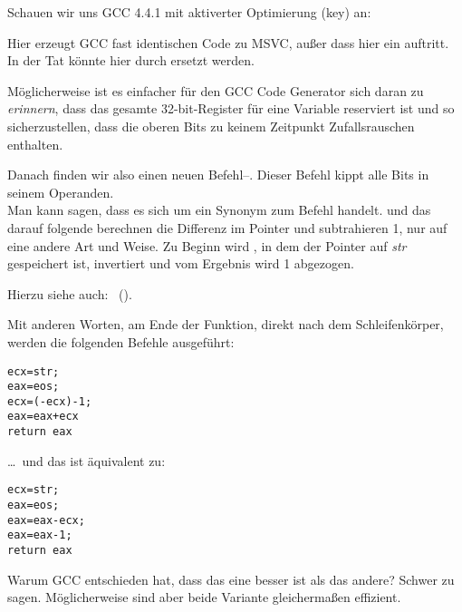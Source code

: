 


Schauen wir uns GCC 4.4.1 mit aktiverter Optimierung (\Othree key) an:


 
Hier erzeugt GCC fast identischen Code zu MSVC, außer dass hier ein \MOVZX
auftritt. 
In der Tat könnte \MOVZX hier durch  ersetzt werden.
 
Möglicherweise ist es einfacher für den GCC Code Generator sich daran zu
\emph{erinnern}, dass das gesamte 32-bit-\EDX Register für eine \Tchar Variable
reserviert ist und so sicherzustellen, dass die oberen Bits zu keinem Zeitpunkt
Zufallsrauschen enthalten.

\label{strlen_NOT_ADD}

Danach finden wir also einen neuen Befehl--\NOT. Dieser Befehl kippt alle Bits
in seinem Operanden.\\
Man kann sagen, dass es sich um ein Synonym zum Befehl 
handelt. 
\NOT und das darauf folgende \ADD berechnen die Differenz im Pointer und
subtrahieren 1, nur auf eine andere Art und Weise. 
Zu Beginn wird \ECX, in dem der Pointer auf \emph{str} gespeichert ist, invertiert
und vom Ergebnis wird 1 abgezogen.

Hierzu siehe auch: \q{\SignedNumbersSectionName}~().
 
Mit anderen Worten, am Ende der Funktion, direkt nach dem Schleifenkörper,
werden die folgenden Befehle ausgeführt:

\begin{lstlisting}[style=customc]
ecx=str;
eax=eos;
ecx=(-ecx)-1; 
eax=eax+ecx
return eax
\end{lstlisting}

\dots~und das ist äquivalent zu:

\begin{lstlisting}[style=customc]
ecx=str;
eax=eos;
eax=eax-ecx;
eax=eax-1;
return eax
\end{lstlisting}

Warum GCC entschieden hat, dass das eine besser ist als das andere? Schwer zu
sagen.
Möglicherweise sind aber beide Variante gleichermaßen effizient.
